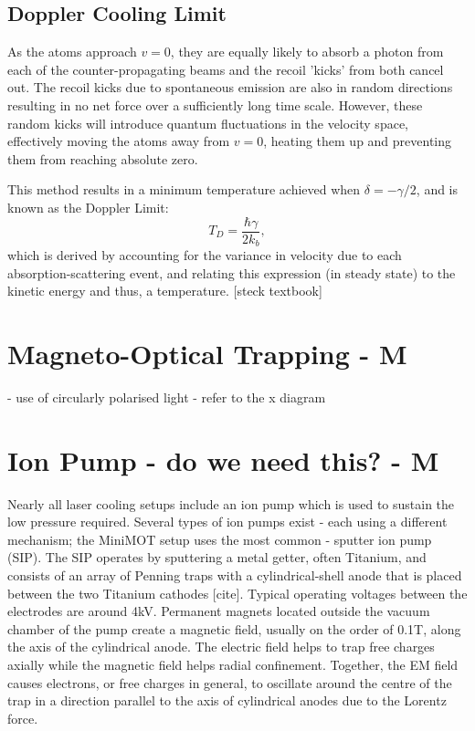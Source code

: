 \documentclass[12pt,twoside]{article}
\begin{document}
\subsection{Doppler Cooling Limit}
As the atoms approach $v = 0$, they are equally likely to absorb a photon from each of the counter-propagating beams and the recoil 'kicks' from both cancel out. The recoil kicks due to spontaneous emission are also in random directions resulting in no net force over a sufficiently long time scale. However, these random kicks will introduce quantum fluctuations in the velocity space, effectively moving the atoms away from $v = 0$, heating them up and preventing them from reaching absolute zero.

This method results in a minimum temperature achieved when $\delta = -\gamma/2$, and is known as the Doppler Limit:
\begin{equation}
    T_D = \frac{\hbar \gamma}{2 k_b},
    \label{eqn: doppler limit}
\end{equation}
which is derived by accounting for the variance in velocity due to each absorption-scattering event, and relating this expression (in steady state) to the kinetic energy and thus, a temperature. [steck textbook]


\section{Magneto-Optical Trapping - M}
- use of circularly polarised light
- refer to the x diagram


\section{Ion Pump - do we need this? - M}
Nearly all laser cooling setups include an ion pump which is used to sustain the low pressure required. Several types of ion pumps exist - each using a different mechanism; the MiniMOT setup uses the most common - sputter ion pump (SIP). The SIP operates by sputtering a metal getter, often Titanium, and consists of an array of Penning traps with a cylindrical-shell anode that is placed between the two Titanium cathodes [cite]. Typical operating voltages between the electrodes are around 4kV. Permanent magnets located outside the vacuum chamber of the pump create a magnetic field, usually on the order of 0.1T, along the axis of the cylindrical anode. 
The electric field helps to trap free charges axially while the magnetic field helps radial confinement. Together, the EM field causes electrons, or free charges in general, to oscillate around the centre of the trap in a direction parallel to the axis of cylindrical anodes due to the Lorentz force. 
\end{document}
